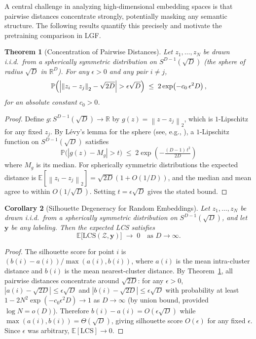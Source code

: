\documentclass[12pt]{article}
\newtheorem{theorem}{Theorem}[section]
\newtheorem{corollary}[theorem]{Corollary}
\theoremstyle{definition}
\theoremstyle{remark}
\newcommand{\R}{\mathbb{R}}
\newcommand{\E}{\mathbb{E}}
\newcommand{\Prob}{\mathbb{P}}
\newcommand{\Zset}{\mathcal{Z}}
\newcommand{\norm}[1]{\left\lVert #1 \right\rVert}
\newcommand{\lcs}{\mathrm{LCS}}
\begin{document}
A central challenge in analyzing high-dimensional embedding spaces is that
pairwise distances concentrate strongly, potentially masking any semantic
structure. The following results quantify this precisely and motivate the
pretraining comparison in LGF.

\begin{theorem}[Concentration of Pairwise Distances]
\label{thm:concentration}
Let $z_1, \ldots, z_N$ be drawn i.i.d.\ from a spherically symmetric
distribution on $S^{D-1}(\sqrt{D})$ (the sphere of radius $\sqrt{D}$ in
$\R^D$). For any $\epsilon > 0$ and any pair $i \neq j$,
\[
  \Prob\!\left(\Bigl|\norm{z_i - z_j}_2 - \sqrt{2D}\Bigr| > \epsilon\sqrt{D}\right)
  \;\leq\; 2\exp\!\left(-c_0\,\epsilon^2 D\right),
\]
for an absolute constant $c_0 > 0$.
\end{theorem}

\begin{proof}
Define $g: S^{D-1}(\sqrt{D}) \to \R$ by $g(z) = \norm{z - z_j}_2$, which is
$1$-Lipschitz for any fixed $z_j$. By L\'{e}vy's lemma for the sphere
(see, e.g., \citealt{ledoux2001concentration}), a $1$-Lipschitz function on
$S^{D-1}(\sqrt{D})$ satisfies
\[
  \Prob\!\bigl(|g(z) - M_g| > t\bigr) \;\leq\; 2\exp\!\left(-\tfrac{(D-1)\,t^2}{2D}\right)
\]
where $M_g$ is its median. For spherically symmetric distributions the
expected distance is $\E[\norm{z_i - z_j}_2] = \sqrt{2D}(1 + O(1/D))$, and
the median and mean agree to within $O(1/\sqrt{D})$. Setting
$t = \epsilon\sqrt{D}$ gives the stated bound.
\end{proof}

\begin{corollary}[Silhouette Degeneracy for Random Embeddings]
\label{cor:lcs_degenerate}
Let $z_1, \ldots, z_N$ be drawn i.i.d.\ from a spherically symmetric
distribution on $S^{D-1}(\sqrt{D})$, and let $\mathbf{y}$ be any labeling.
Then the expected LCS satisfies
\[
  \E\bigl[\lcs(\Zset, \mathbf{y})\bigr] \;\to\; 0 \quad \text{as } D \to \infty.
\]
\end{corollary}

\begin{proof}
The silhouette score for point $i$ is $(b(i) - a(i))/\max(a(i), b(i))$,
where $a(i)$ is the mean intra-cluster distance and $b(i)$ is the mean
nearest-cluster distance. By Theorem~\ref{thm:concentration}, all pairwise
distances concentrate around $\sqrt{2D}$: for any $\epsilon > 0$,
$|a(i) - \sqrt{2D}| \leq \epsilon\sqrt{D}$ and
$|b(i) - \sqrt{2D}| \leq \epsilon\sqrt{D}$ with probability at least
$1 - 2N^2 \exp(-c_0 \epsilon^2 D) \to 1$ as $D \to \infty$ (by union bound,
provided $\log N = o(D)$).
Therefore $b(i) - a(i) = O(\epsilon\sqrt{D})$ while
$\max(a(i), b(i)) = \Theta(\sqrt{D})$, giving silhouette score $O(\epsilon)$
for any fixed $\epsilon$. Since $\epsilon$ was arbitrary,
$\E[\lcs] \to 0$.
\end{proof}
\end{document}
